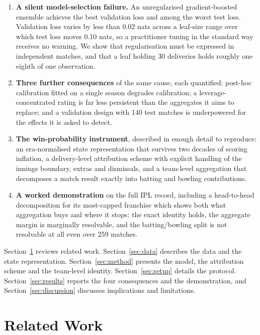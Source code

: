 \documentclass[conference]{IEEEtran}
\begin{document}
\begin{enumerate}
\item \textbf{A silent model-selection failure.} An unregularised
gradient-boosted ensemble achieves the best validation loss and among
the worst test loss. Validation loss varies by less than 0.02 nats
across a leaf-size range over which test loss moves 0.10 nats, so a
practitioner tuning in the standard way receives no warning. We show
that regularisation must be expressed in independent matches, and that
a leaf holding 30 deliveries holds roughly one eighth of one
observation.
\item \textbf{Three further consequences} of the same cause, each
quantified: post-hoc calibration fitted on a single season degrades
calibration; a leverage-concentrated rating is far less persistent than
the aggregates it aims to replace; and a validation design with 140
test matches is underpowered for the effects it is asked to detect.
\item \textbf{The win-probability instrument}, described in enough
detail to reproduce: an era-normalised state representation that
survives two decades of scoring inflation, a delivery-level attribution
scheme with explicit handling of the innings boundary, extras and
dismissals, and a team-level aggregation that decomposes a match result
exactly into batting and bowling contributions.
\item \textbf{A worked demonstration} on the full IPL record, including
a head-to-head decomposition for its most-capped franchise which shows
both what aggregation buys and where it stops: the exact identity holds,
the aggregate margin is marginally resolvable, and the batting/bowling
split is not resolvable at all even over 259 matches.
\end{enumerate}

Section~\ref{sec:related} reviews related work.
Section~\ref{sec:data} describes the data and the state representation.
Section~\ref{sec:method} presents the model, the attribution scheme and
the team-level identity. Section~\ref{sec:setup} details the protocol.
Section~\ref{sec:results} reports the four consequences and the
demonstration, and Section~\ref{sec:discussion} discusses implications
and limitations.

\section{Related Work}
\label{sec:related}
\end{document}
